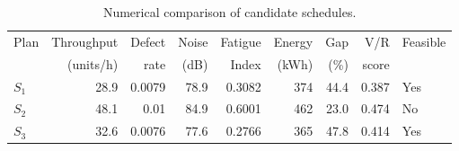 \begin{table}[htbp]
\centering
\caption{Numerical comparison of candidate schedules.}
\label{tab:numerical-sim}
\small
\begin{tabular}{@{}lrrrrrrrl@{}}
\toprule
Plan & Throughput & Defect & Noise & Fatigue & Energy & Gap & V/R & Feasible \\
     & (units/h)  & rate   & (dB)  & Index   & (kWh)  & (\%) & score &         \\
\midrule
$S_{1}$ & 28.9 & 0.0079 & 78.9 & 0.3082 & 374 & 44.4 & 0.387 & Yes \\
$S_{2}$ & 48.1 & 0.01 & 84.9 & 0.6001 & 462 & 23.0 & 0.474 & No \\
$S_{3}$ & 32.6 & 0.0076 & 77.6 & 0.2766 & 365 & 47.8 & 0.414 & Yes \\
\bottomrule
\end{tabular}
\end{table}
